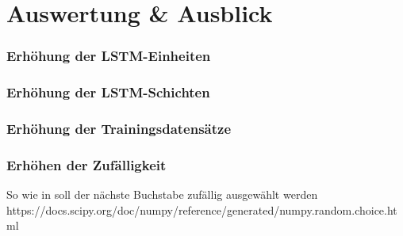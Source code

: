 \chapter{Auswertung \& Ausblick}
\label{ch:analysis}

\subsection{Erhöhung der LSTM-Einheiten}
\label{subsec:increase-lstm}

\subsection{Erhöhung der LSTM-Schichten}
\label{subsec:increase-lstm-layers}

\subsection{Erhöhung der Trainingsdatensätze}
\label{subsec:increase-num-dataset}

\subsection{Erhöhen der Zufälligkeit}
\label{subsec:increase-randomness}

So wie in \autocite{dabbura} soll der nächste Buchstabe zufällig ausgewählt werden
https://docs.scipy.org/doc/numpy/reference/generated/numpy.random.choice.html
